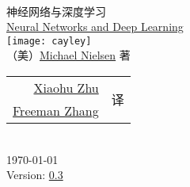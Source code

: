 
\begin{titlepage}
\begin{center}
  \hfill\\
  \vspace{1cm}
  {\fontsize{36pt}{40pt}\NotoSansSCBold{} 神经网络与深度学习}\\
  \vspace{1em}
  {\LARGE\RobotoRegular{} \href{http://neuralnetworksanddeeplearning.com/index.html}{Neural Networks and Deep Learning}}\\
  \vspace{1cm}
  \texttt{[image: cayley]}\\
  \vspace{1cm}
  {\LARGE （美）\href{http://michaelnielsen.org/}{Michael Nielsen} 著}\\
  \vspace{1cm}
  {\Large
    \begin{tabular}{rl}
      \href{mailto:xhzhu.nju@gmail}{Xiaohu Zhu} & \multirow{2}{*}{译} \\
      \href{mailto:zhanggyb@gmail.com}{Freeman Zhang} & \\
    \end{tabular}
  }\\
  \vfill
  {\large \today}\\
  \vspace{1em}
  {\large Version: \href{https://github.com/zhanggyb/nndl/releases/tag/0.3}{0.3}}
\end{center}
\end{titlepage}

